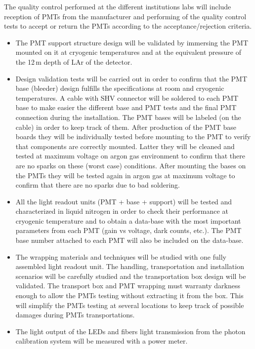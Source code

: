 The quality control performed at the different institutions labs will include reception of PMTs from the manufacturer and performing of the quality control tests to accept or return the PMTs according to the acceptance/rejection criteria. 
\begin{itemize}
\item The PMT support structure design will be validated by immersing the PMT mounted on it at cryogenic temperatures and at the equivalent pressure of the 12\,m depth of LAr of the detector.
\item Design validation tests will be carried out in order to confirm that the PMT base (bleeder) design fulfills the specifications at room and cryogenic temperatures. A cable with SHV connector will be soldered to each PMT base to make easier the different base and PMT tests and the final PMT connection during the installation. The PMT bases will be labeled (on the cable) in order to keep track of them. After production of the PMT base boards they will be individually tested before mounting to the PMT to verify that components are correctly mounted. Latter they will be cleaned and tested at maximum voltage on argon gas environment to confirm that there are no sparks on these (worst case) conditions.
After mounting the bases on the PMTs they will be tested again in argon gas at maximum voltage to confirm that there are no sparks due to bad soldering.
\item All the light readout units (PMT + base + support) will be tested and characterized in liquid nitrogen in order to check their performance at cryogenic temperature and to obtain a data-base with the most important parameters from each PMT (gain vs voltage, dark counts, etc.). The PMT base number attached to each PMT will also be included on the data-base. 
\item The wrapping materials and techniques will be studied with one fully assembled light readout unit. The handling, transportation and installation scenarios will be carefully studied and the transportation box design will be validated. The transport box and PMT wrapping must warranty darkness enough to allow the PMTs testing without extracting it from the box. This will simplify the PMTs testing at several locations to keep track of possible damages during PMTs transportations.
\item The light output of the LEDs and fibers light transmission from the photon calibration system will be measured with a power meter.
\end{itemize}

